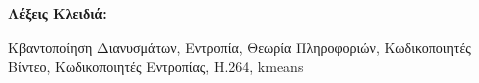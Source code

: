 ﻿\thispagestyle{plain}
\begin{abstract}

\end{abstract}
\vspace{0.5in}
\begin{Large}
\textbf{Λέξεις Κλειδιά:}\\
\end{Large}
Κβαντοποίηση Διανυσμάτων, Εντροπία, Θεωρία Πληροφοριών, Κωδικοποιητές Βίντεο, Κωδικοποιητές Εντροπίας, H.264, kmeans